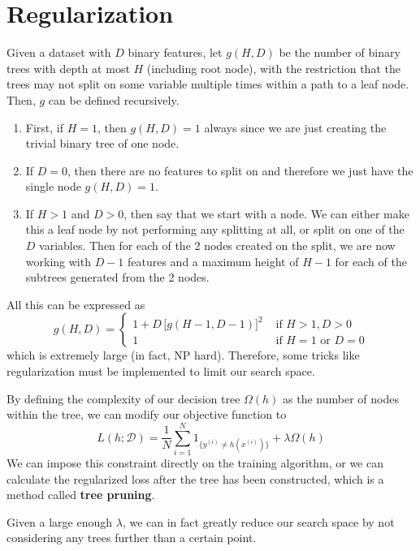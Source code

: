 \section{Regularization} 

  Given a dataset with $D$ binary features, let $g(H, D)$ be the number of binary trees with depth at most $H$ (including root node), with the restriction that the trees may not split on some variable multiple times within a path to a leaf node. Then, $g$ can be defined recursively. 
  \begin{enumerate}
      \item First, if $H = 1$, then $g(H, D) = 1$ always since we are just creating the trivial binary tree of one node. 
      \item If $D = 0$, then there are no features to split on and therefore we just have the single node $g(H, D) = 1$. 
      \item If $H > 1$ and $D > 0$, then say that we start with a node. We can either make this a leaf node by not performing any splitting at all, or split on one of the $D$ variables. Then for each of the 2 nodes created on the split, we are now working with $D-1$ features and a maximum height of $H-1$ for each of the subtrees generated from the 2 nodes. 
  \end{enumerate}
  All this can be expressed as 
  \begin{equation}
    g(H, D) = \begin{cases} 1 + D \, \big[ g(H - 1, D - 1) \big]^2 & \text{ if } H > 1, D > 0 \\ 1 & \text{ if } H = 1 \text{ or } D = 0 \end{cases}
  \end{equation}
  which is extremely large (in fact, NP hard). Therefore, some tricks like regularization must be implemented to limit our search space. 

  By defining the complexity of our decision tree $\Omega(h)$ as the number of nodes within the tree, we can modify our objective function to 
  \begin{equation}
    L(h; \mathcal{D}) = \frac{1}{N} \sum_{i=1}^N 1_{\{y^{(i)} \neq h(x^{(i)})\}} + \lambda \Omega(h)
  \end{equation}
  We can impose this constraint directly on the training algorithm, or we can calculate the regularized loss after the tree has been constructed, which is a method called \textbf{tree pruning}. 

  Given a large enough $\lambda$, we can in fact greatly reduce our search space by not considering any trees further than a certain point. 

